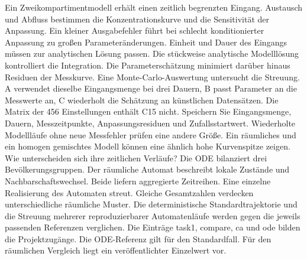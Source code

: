 Ein Zweikompartimentmodell erhält einen zeitlich begrenzten Eingang. Austausch und Abfluss bestimmen die Konzentrationskurve und die Sensitivität der Anpassung.
Ein kleiner Ausgabefehler führt bei schlecht konditionierter Anpassung zu großen Parameteränderungen. Einheit und Dauer des Eingangs müssen zur analytischen Lösung passen.
Die stückweise analytische Modelllösung kontrolliert die Integration. Die Parameterschätzung minimiert darüber hinaus Residuen der Messkurve. Eine Monte-Carlo-Auswertung untersucht die Streuung.
A verwendet dieselbe Eingangsmenge bei drei Dauern, B passt Parameter an die Messwerte an, C wiederholt die Schätzung an künstlichen Datensätzen. Die Matrix der 456 Einstellungen enthält C15 nicht.
Speichern Sie Eingangsmenge, Dauern, Messzeitpunkte, Anpassungsresiduen und Zufallsstartwert. Wiederholte Modellläufe ohne neue Messfehler prüfen eine andere Größe.
Ein räumliches und ein homogen gemischtes Modell können eine ähnlich hohe Kurvenspitze zeigen. Wie unterscheiden sich ihre zeitlichen Verläufe?
Die ODE bilanziert drei Bevölkerungsgruppen. Der räumliche Automat beschreibt lokale Zustände und Nachbarschaftswechsel. Beide liefern aggregierte Zeitreihen.
Eine einzelne Realisierung des Automaten streut. Gleiche Gesamtzahlen verdecken unterschiedliche räumliche Muster.
Die deterministische Standardtrajektorie und die Streuung mehrerer reproduzierbarer Automatenläufe werden gegen die jeweils passenden Referenzen verglichen.
Die Einträge task1, compare, ca und ode bilden die Projektzugänge. Die ODE-Referenz gilt für den Standardfall. Für den räumlichen Vergleich liegt ein veröffentlichter Einzelwert vor.
